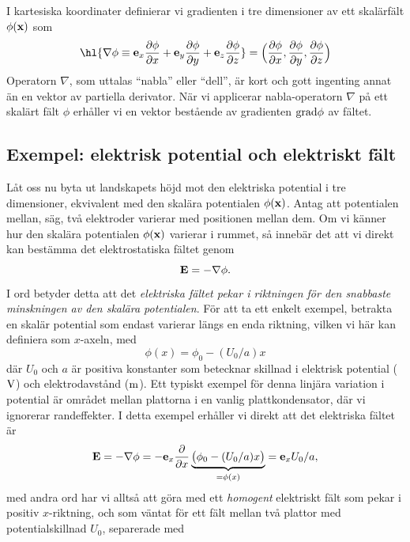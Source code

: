 I kartesiska koordinater definierar vi gradienten i tre dimensioner av ett
skal{\"a}rf{\"a}lt $\phi({\bf x})$ som
$$
  \hl{
  \nabla\phi
    \equiv{\bf e}_x{{\partial\phi}\over{\partial x}}
        +{\bf e}_y{{\partial\phi}\over{\partial y}}
        +{\bf e}_z{{\partial\phi}\over{\partial z}}
        }
    =\Big(
       {{\partial\phi}\over{\partial x}},
       {{\partial\phi}\over{\partial y}},
       {{\partial\phi}\over{\partial z}}
     \Big)
$$
Operatorn $\nabla$, som uttalas ``nabla'' eller ``dell'', {\"a}r kort och gott
ingenting annat {\"a}n en vektor av partiella derivator. N{\"a}r vi applicerar
nabla-operatorn $\nabla$ p{\aa} ett skal{\"a}rt f{\"a}lt $\phi$ erh{\aa}ller
vi en vektor best{\aa}ende av gradienten ${\rm grad}\phi$ av f{\"a}ltet.

\subsection{Exempel: elektrisk potential och elektriskt f{\"a}lt}
L{\aa}t oss nu byta ut landskapets h{\"o}jd mot den elektriska potential i
tre dimensioner, ekvivalent med den skal{\"a}ra potentialen $\phi({\bf x})$.
Antag att potentialen mellan, s{\"a}g, tv{\aa} elektroder varierar med
positionen mellan dem. Om vi k{\"a}nner hur den skal{\"a}ra potentialen
$\phi({\bf x})$ varierar i rummet, s{\aa} inneb{\"a}r det att vi direkt kan
best{\"a}mma det elektrostatiska f{\"a}ltet genom
$$
  {\bf E}=-\nabla\phi.
$$
I ord betyder detta att det {\it elektriska f{\"a}ltet pekar i riktningen
f{\"o}r den snabbaste minskningen av den skal{\"a}ra potentialen}.
\noindent
F{\"o}r att ta ett enkelt exempel, betrakta en skal{\"a}r potential som endast
varierar l{\"a}ngs en enda riktning, vilken vi h{\"a}r kan definiera som
$x$-axeln, med
$$
  \phi(x)=\phi_0-({{U_0}/{a}})x
$$
d{\"a}r $U_0$ och $a$ {\"a}r positiva konstanter som betecknar skillnad i
elektrisk potential (${\rm V}$) och elektrodavst{\aa}nd (${\rm m}$).
Ett typiskt exempel f{\"o}r denna linj{\"a}ra variation i potential {\"a}r
omr{\aa}det mellan plattorna i en vanlig plattkondensator, d{\"a}r vi ignorerar
randeffekter.
I detta exempel erh{\aa}ller vi direkt att det elektriska f{\"a}ltet {\"a}r
$$
  {\bf E}
    =-\nabla\phi
    =-{\bf e}_x{{\partial}\over{\partial x}}
        \underbrace{\big(\phi_0-({{U_0}/{a}})x\big)}_{=\phi(x)}
    ={\bf e}_xU_0/a,
$$
med andra ord har vi allts{\aa} att g{\"o}ra med ett {\it homogent} elektriskt
f{\"a}lt som pekar i positiv $x$-riktning, och som v{\"a}ntat f{\"o}r ett
f{\"a}lt mellan tv{\aa} plattor med potentialskillnad $U_0$, separerade med
